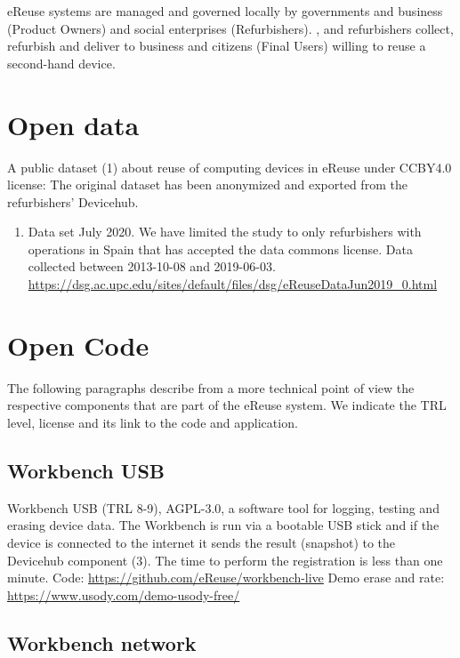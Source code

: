 \documentclass[
]{book}
\providecommand{\tightlist}{%
  \setlength{\itemsep}{0pt}\setlength{\parskip}{0pt}}
\begin{document}
eReuse systems are managed and governed locally by governments and business (Product Owners) and social enterprises (Refurbishers). , and refurbishers collect, refurbish and deliver to business and citizens (Final Users) willing to reuse a second-hand device.

\hypertarget{open-data}{%
\section{Open data}\label{open-data}}

A public dataset (1) about reuse of computing devices in eReuse under CCBY4.0 license: The original dataset has been anonymized and exported from the refurbishers' Devicehub.

\begin{enumerate}
\def\labelenumi{\arabic{enumi}.}
\tightlist
\item
  Data set July 2020. We have limited the study to only refurbishers with operations in Spain that has accepted the data commons license. Data collected between 2013-10-08 and 2019-06-03.
  \url{https://dsg.ac.upc.edu/sites/default/files/dsg/eReuseDataJun2019_0.html}
\end{enumerate}

\hypertarget{open-code}{%
\section{Open Code}\label{open-code}}

The following paragraphs describe from a more technical point of view the respective components that are part of the eReuse system. We indicate the TRL level, license and its link to the code and application.

\hypertarget{workbench-usb}{%
\subsection{Workbench USB}\label{workbench-usb}}

Workbench USB (TRL 8-9), AGPL-3.0, a software tool for logging, testing and erasing device data. The Workbench is run via a bootable USB stick and if the device is connected to the internet it sends the result (snapshot) to the Devicehub component (3). The time to perform the registration is less than one minute.
Code: \url{https://github.com/eReuse/workbench-live}
Demo erase and rate: \url{https://www.usody.com/demo-usody-free/}

\hypertarget{workbench-network}{%
\subsection{Workbench network}\label{workbench-network}}
\end{document}
